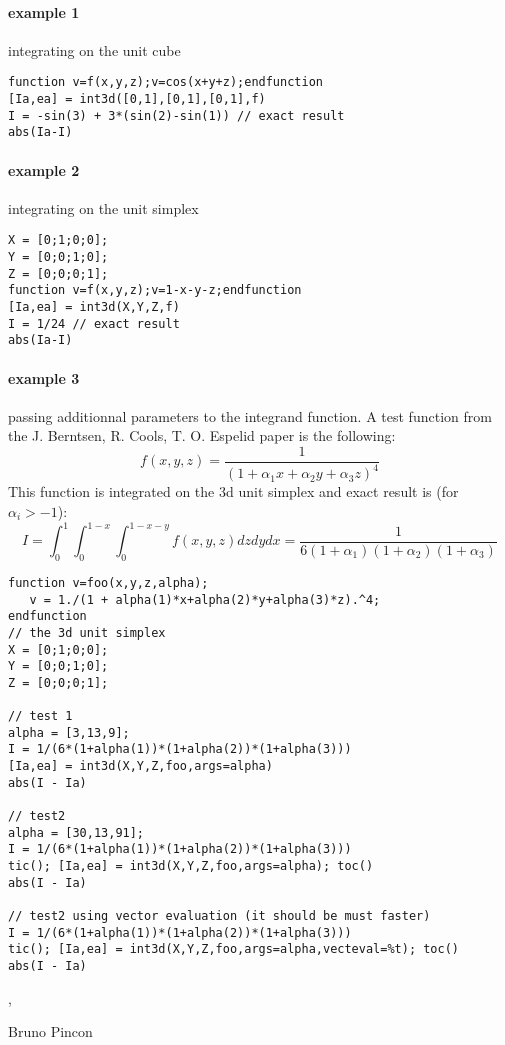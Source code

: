 \begin{examples}
  
\paragraph{example 1} integrating on the unit cube 
\begin{Verbatim}
function v=f(x,y,z);v=cos(x+y+z);endfunction
[Ia,ea] = int3d([0,1],[0,1],[0,1],f)
I = -sin(3) + 3*(sin(2)-sin(1)) // exact result  
abs(Ia-I)
\end{Verbatim}
  
\paragraph{example 2} integrating on the unit simplex
\begin{Verbatim}
X = [0;1;0;0];
Y = [0;0;1;0];
Z = [0;0;0;1];
function v=f(x,y,z);v=1-x-y-z;endfunction
[Ia,ea] = int3d(X,Y,Z,f)
I = 1/24 // exact result  
abs(Ia-I)
\end{Verbatim}
  
\paragraph{example 3} passing additionnal parameters to the integrand function.
A test function from the J. Berntsen, R. Cools, T. O. Espelid paper is the
following:
$$
 f(x,y,z) = \frac{1}{(1 + \alpha_1 x +  \alpha_2 y +  \alpha_3 z)^4 } 
$$
This function is integrated on the 3d unit simplex and exact result is (for $\alpha_i > -1$):
$$
I = \int_0^1 \int_0^{1-x} \int_0^{1-x-y} f(x,y,z) dz dy dx = \frac{1}{6 (1+\alpha_1)(1+\alpha_2)(1+\alpha_3)}
$$
\begin{Verbatim}
function v=foo(x,y,z,alpha);
   v = 1./(1 + alpha(1)*x+alpha(2)*y+alpha(3)*z).^4;
endfunction
// the 3d unit simplex
X = [0;1;0;0];
Y = [0;0;1;0];
Z = [0;0;0;1];

// test 1
alpha = [3,13,9];
I = 1/(6*(1+alpha(1))*(1+alpha(2))*(1+alpha(3)))
[Ia,ea] = int3d(X,Y,Z,foo,args=alpha)
abs(I - Ia)

// test2
alpha = [30,13,91];
I = 1/(6*(1+alpha(1))*(1+alpha(2))*(1+alpha(3)))
tic(); [Ia,ea] = int3d(X,Y,Z,foo,args=alpha); toc()
abs(I - Ia)

// test2 using vector evaluation (it should be must faster)
I = 1/(6*(1+alpha(1))*(1+alpha(2))*(1+alpha(3)))
tic(); [Ia,ea] = int3d(X,Y,Z,foo,args=alpha,vecteval=%t); toc()
abs(I - Ia)

\end{Verbatim}

\end{examples}

\begin{manseealso}
   ,    
\end{manseealso}

\begin{authors}
  Bruno Pincon
\end{authors}

